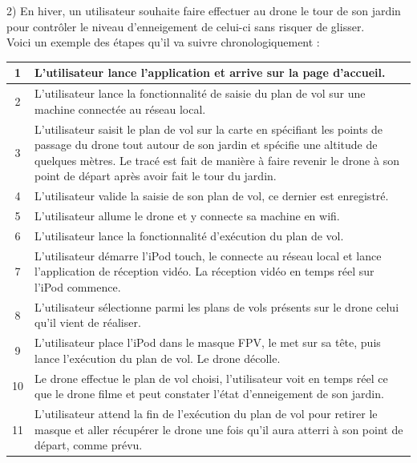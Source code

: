 \documentclass{article}
\begin{document}
        \newpage
        \begin{flushleft}
        2) En hiver, un utilisateur souhaite faire effectuer au drone le tour de son jardin pour contrôler le niveau d'enneigement de celui-ci sans risquer de glisser.\\
        Voici un exemple des étapes qu'il va suivre chronologiquement : \\ [1cm]
        \end{flushleft}
	    \begin{center}
	    \renewcommand{\arraystretch}{2}
        \begin{tabularx}{15cm}{|c|X|}
            \hline
            1 & L'utilisateur lance l'application et arrive sur la page d'accueil.\\
            \hline
            2 & L'utilisateur lance la fonctionnalité de saisie du plan de vol sur une machine connectée au réseau local.\\
            \hline
            3 & L'utilisateur saisit le plan de vol sur la carte en spécifiant les points de passage du drone tout autour de son jardin et spécifie une altitude de quelques mètres. Le tracé est fait de manière à faire revenir le drone à son point de départ après avoir fait le tour du jardin. \\
            \hline
            4 & L'utilisateur valide la saisie de son plan de vol, ce dernier est enregistré. \\
            \hline
            5 & L'utilisateur allume le drone et y connecte sa machine en wifi. \\
            \hline
            6 & L'utilisateur lance la fonctionnalité d'exécution du plan de vol. \\
            \hline
            7 &  L'utilisateur démarre l'iPod touch, le connecte au réseau local et lance l'application de réception vidéo. La réception vidéo en temps réel sur l'iPod commence.\\
            \hline
            8 & L'utilisateur sélectionne parmi les plans de vols présents sur le drone celui qu'il vient de réaliser. \\
            \hline
            9 & L'utilisateur place l'iPod dans le masque FPV, le met sur sa tête, puis lance l'exécution du plan de vol. Le drone décolle. \\
            \hline
            10 & Le drone effectue le plan de vol choisi, l'utilisateur voit en temps réel ce que le drone filme et peut constater l'état d'enneigement de son jardin. \\
            \hline
            11 & L'utilisateur attend la fin de l'exécution du plan de vol pour retirer le masque et aller récupérer le drone une fois qu'il aura atterri à son point de départ, comme prévu.\\
            \hline 
        \end{tabularx}
        \end{center}
        \vspace*{1cm}
\end{document}
